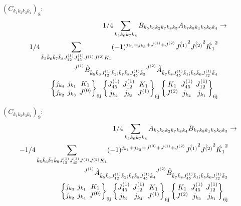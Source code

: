 \documentclass[11pt]{article}
\newcommand{\sixj}[6]{\begingroup\setlength{\arraycolsep}{0.2em}\begin{Bmatrix} #1 & #2 & #3 \\ #4 & #5 & #6 \end{Bmatrix}_{\text{6j}}\endgroup}
\begin{document}
$\left({C}_{{k}_{1}{k}_{2}{k}_{3}{k}_{4}}\right)_{8}$:
\begin{align}
1/4\sum_{{k}_{5}{k}_{6}{k}_{7}{k}_{8}}{B}_{{k}_{5}{k}_{6}{k}_{2}{k}_{7}{k}_{8}{k}_{3}}{A}_{{k}_{7}{k}_{8}{k}_{1}{k}_{5}{k}_{6}{k}_{4}}&\rightarrow \notag \\1/4\sum_{\tilde{k}_{5}\tilde{k}_{6}\tilde{k}_{7}\tilde{k}_{8}J^{(1)}_{12}J^{(1)}_{45}J^{(1)}J^{(2)}K_{1}}(-1)^{j_{{k}_{1}} +j_{{k}_{3}} +J^{(1)} +J^{(2)} }\hat{J^{(1)}}^{2}\hat{J^{(2)}}^{2}\hat{K_{1}}^{2}& \notag \\{}^{J^{(1)}}\tilde{B}_{\tilde{k}_{5}\tilde{k}_{6}J^{(1)}_{12}\tilde{k}_{2};\tilde{k}_{7}\tilde{k}_{8}J^{(1)}_{45}\tilde{k}_{3}}{}^{J^{(2)}}\tilde{A}_{\tilde{k}_{7}\tilde{k}_{8}J^{(1)}_{45}\tilde{k}_{1};\tilde{k}_{5}\tilde{k}_{6}J^{(1)}_{12}\tilde{k}_{4}}& \notag \\\sixj{j_{{k}_{4}}}{j_{{k}_{1}}}{K_{1}}{j_{{k}_{2}}}{j_{{k}_{3}}}{J^{(0)}}\sixj{J^{(1)}_{45}}{J^{(1)}_{12}}{K_{1}}{j_{{k}_{2}}}{j_{{k}_{3}}}{J^{(1)}}\sixj{K_{1}}{J^{(1)}_{45}}{J^{(1)}_{12}}{J^{(2)}}{j_{{k}_{4}}}{j_{{k}_{1}}}
\end{align}

$\left({C}_{{k}_{1}{k}_{2}{k}_{3}{k}_{4}}\right)_{9}$:
\begin{align}
1/4\sum_{{k}_{5}{k}_{6}{k}_{7}{k}_{8}}{A}_{{k}_{5}{k}_{6}{k}_{2}{k}_{7}{k}_{8}{k}_{4}}{B}_{{k}_{7}{k}_{8}{k}_{1}{k}_{5}{k}_{6}{k}_{3}}&\rightarrow \notag \\-1/4\sum_{\tilde{k}_{5}\tilde{k}_{6}\tilde{k}_{7}\tilde{k}_{8}J^{(1)}_{12}J^{(1)}_{45}J^{(1)}J^{(2)}K_{1}}(-1)^{j_{{k}_{1}} +j_{{k}_{3}} +J^{(0)} +J^{(1)} +J^{(2)} }\hat{J^{(1)}}^{2}\hat{J^{(2)}}^{2}\hat{K_{1}}^{2}& \notag \\{}^{J^{(1)}}\tilde{A}_{\tilde{k}_{5}\tilde{k}_{6}J^{(1)}_{12}\tilde{k}_{2};\tilde{k}_{7}\tilde{k}_{8}J^{(1)}_{45}\tilde{k}_{4}}{}^{J^{(2)}}\tilde{B}_{\tilde{k}_{7}\tilde{k}_{8}J^{(1)}_{45}\tilde{k}_{1};\tilde{k}_{5}\tilde{k}_{6}J^{(1)}_{12}\tilde{k}_{3}}& \notag \\\sixj{j_{{k}_{3}}}{j_{{k}_{1}}}{K_{1}}{j_{{k}_{2}}}{j_{{k}_{4}}}{J^{(0)}}\sixj{J^{(1)}_{45}}{J^{(1)}_{12}}{K_{1}}{j_{{k}_{2}}}{j_{{k}_{4}}}{J^{(1)}}\sixj{K_{1}}{J^{(1)}_{45}}{J^{(1)}_{12}}{J^{(2)}}{j_{{k}_{3}}}{j_{{k}_{1}}}
\end{align}
\end{document}
